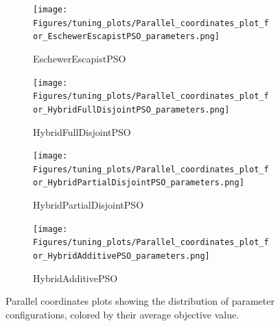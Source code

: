 \begin{figure}[H]\ContinuedFloat
    \centering
    \begin{subfigure}{0.49\textwidth}
        \centering
        \texttt{[image: Figures/tuning\_plots/Parallel\_coordinates\_plot\_for\_EschewerEscapistPSO\_parameters.png]}
        \caption{EschewerEscapistPSO}
    \end{subfigure}
    \begin{subfigure}{0.49\textwidth}
        \centering
        \texttt{[image: Figures/tuning\_plots/Parallel\_coordinates\_plot\_for\_HybridFullDisjointPSO\_parameters.png]}
        \caption{HybridFullDisjointPSO}
    \end{subfigure}
    \begin{subfigure}{0.49\textwidth}
        \centering
        \texttt{[image: Figures/tuning\_plots/Parallel\_coordinates\_plot\_for\_HybridPartialDisjointPSO\_parameters.png]}
        \caption{HybridPartialDisjointPSO}
    \end{subfigure}
    \begin{subfigure}{0.49\textwidth}
        \centering
        \texttt{[image: Figures/tuning\_plots/Parallel\_coordinates\_plot\_for\_HybridAdditivePSO\_parameters.png]}
        \caption{HybridAdditivePSO}
    \end{subfigure}
\caption[Parallel coordinates plots of parameter configurations]{Parallel coordinates plots showing the distribution of  parameter configurations, colored by their average objective value.}
\label{fig:parameter_plots}
\end{figure}